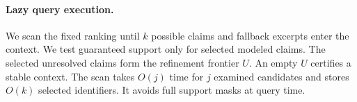 \paragraph{Lazy query execution.}
We scan the fixed ranking until $k$ possible claims and fallback excerpts enter the context.
We test guaranteed support only for selected modeled claims.
The selected unresolved claims form the refinement frontier $U$.
An empty $U$ certifies a stable context.
The scan takes $O(j)$ time for $j$ examined candidates and stores $O(k)$ selected identifiers.
It avoids full support masks at query time.
